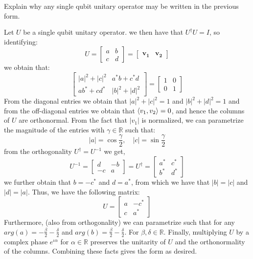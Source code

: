 \begin{example}
    Explain why any single qubit unitary operator may be written in the previous form.

    Let $U$ be a single qubit unitary operator. we then have that $U^{\dagger}U=I$, so identifying: 
    \[
    U=\begin{bmatrix} a & b \\ c & d \end{bmatrix} = \begin{bmatrix} \mathbf{v_1} & \mathbf{v_2} \end{bmatrix}
    \]
    we obtain that:
    \[
    \begin{bmatrix} |a|^2 + |c|^2 & a^*b+c^*d \\ ab^*+cd^* & |b|^2+|d|^2 \end{bmatrix} = \begin{bmatrix} 1 & 0 \\ 0 & 1 \end{bmatrix}
    \]
    From the diagonal entries we obtain that $|a|^2+|c|^2=1$ and $|b|^2+|d|^2=1$ and from the off-diagonal entries we obtain that $\braket{v_1,v_2}=0$, and hence the columns of $U$ are orthonormal. From the fact that $|v_1|$ is normalized, we can parametrize the magnitude of the entries with $\gamma \in \mathbb{R}$ such that:
    \[
    |a|=\cos \frac{\gamma}{2}, \quad |c|=\sin \frac{\gamma}{2}
    \]
    from the orthogonality $U^{\dagger}=U^{-1}$ we get, 
    \[
    U^{-1}=\begin{bmatrix} d & -b \\ -c & a \end{bmatrix} =U^{\dagger} = \begin{bmatrix} a^* & c^* \\ b^* & d^* \end{bmatrix}
    \]
    we further obtain that $b=-c^*$ and $d=a^*$, from which we have that $|b|=|c|$ and $|d|=|a|$. Thus, we have the following matrix:
    \[
    U=\begin{bmatrix} a & -c^* \\c & a^* \end{bmatrix}
    \]
    Furthermore, (also from orthogonality) we can parametrize such that for any $arg(a)=-\frac{\beta}{2}-\frac{\delta}{2}$ and $arg(b)=\frac{\beta}{2} - \frac{\delta}{2}$. For $\beta,\delta \in \mathbb{R}$. Finally, multiplying $U$ by a complex phase $e^{\iota \alpha}$ for $\alpha \in \mathbb{R}$ preserves the unitarity of $U$ and the orthonormality of the columns. Combining these facts gives the form as desired.

\end{example}
